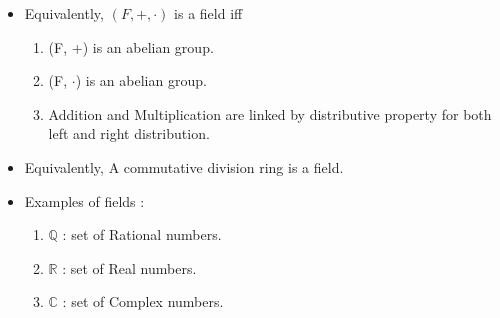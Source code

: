 \documentclass[twoside]{article}
\begin{document}
\begin{itemize}
	\item Equivalently, $(F, +, \cdot)$ is a field iff
		\begin{enumerate}
			\item (F, +) is an abelian group.
			\item (F, $\cdot$) is an abelian group.
			\item Addition and Multiplication are linked by distributive property for both left and right distribution.
		\end{enumerate}
	\item Equivalently, A commutative division ring is a field.
	\item Examples of fields :
		\begin{enumerate}
			\item $\mathbb{Q}$ : set of Rational numbers.
			\item $\mathbb{R}$ : set of Real numbers.
			\item $\mathbb{C}$ : set of Complex numbers.
		\end{enumerate}
\end{itemize}
\end{document}
